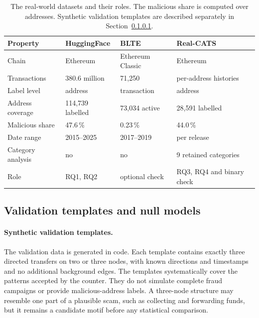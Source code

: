 \begin{table}[ht]
\centering
\caption{The real-world datasets and their roles. The malicious share is
computed over addresses. Synthetic validation templates are described
separately in Section~\ref{sec:dataset_synthetic}.}
\label{tab:dataset_comparison}
\small
\setlength{\tabcolsep}{4pt}
\begin{tabular}{@{}p{3.1cm} p{3.1cm} p{3.0cm} p{3.2cm}@{}}
\toprule
\textbf{Property} & \textbf{HuggingFace} & \textbf{BLTE} & \textbf{Real-CATS} \\
\midrule
Chain              & Ethereum      & Ethereum Classic & Ethereum \\
Transactions       & 380.6 million & 71{,}250         & per-address histories \\
Label level        & address       & transaction      & address \\
Address coverage   & 114{,}739 labelled & 73{,}034 active & 28{,}591 labelled \\
Malicious share    & 47.6\,\%      & 0.23\,\%         & 44.0\,\% \\
Date range         & 2015--2025    & 2017--2019       & per release \\
Category analysis  & no            & no               & 9 retained categories \\
Role               & RQ1, RQ2      & optional check   & RQ3, RQ4 and binary check \\
\bottomrule
\end{tabular}
\end{table}

\subsection{Validation templates and null models}
\label{sec:validation_and_null_models}

\paragraph{Synthetic validation templates.}
\label{sec:dataset_synthetic}
The validation data is generated in code. Each template contains exactly three
directed transfers on two or three nodes, with known directions and timestamps
and no additional background edges. The templates systematically cover the
patterns accepted by the counter. They do not simulate complete fraud campaigns
or provide malicious-address labels. A three-node structure may resemble one
part of a plausible scam, such as collecting and forwarding funds, but it
remains a candidate motif before any statistical comparison.


